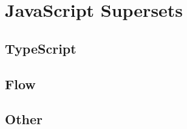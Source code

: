 

\section{JavaScript Supersets}
\label{sec:supersets}

\subsection{TypeScript}
\label{sec:typescript}

\subsection{Flow}
\label{sec:flow}

\subsection{Other}
\label{sec:other-supersets}
